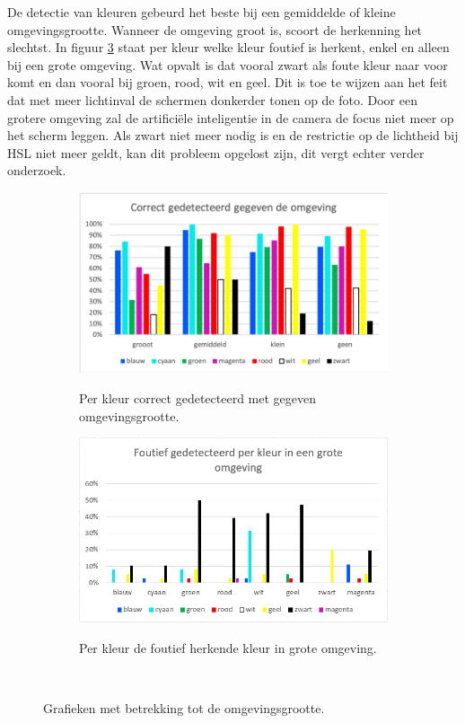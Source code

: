 De detectie van kleuren gebeurd het beste bij een gemiddelde of kleine omgevingsgrootte. Wanneer de omgeving groot is, scoort de herkenning het slechtst. In figuur \ref{fig:groteOmgevingFoutHerkent} staat per kleur welke kleur foutief is herkent, enkel en alleen bij een grote omgeving. Wat opvalt is dat vooral zwart als foute kleur naar voor komt en dan vooral bij groen, rood, wit en geel. Dit is toe te wijzen aan het feit dat met meer lichtinval de schermen donkerder tonen op de foto. Door een grotere omgeving zal de artificiële inteligentie in de camera de focus niet meer op het scherm leggen. Als zwart niet meer nodig is en de restrictie op de lichtheid bij HSL niet meer geldt, kan dit probleem opgelost zijn, dit vergt echter verder onderzoek.
\begin{figure}
	\begin{subfigure}{0.5\textwidth}
	\centering
	\includegraphics{img/Environment}
	\label{fig:omgeving}
	\caption{Per kleur correct gedetecteerd met gegeven omgevingsgrootte.}
	\end{subfigure}
	
	\begin{subfigure}{0.5\textwidth}
	\centering
	\includegraphics{img/BigEnvPerColor}
	\label{fig:groteOmgevingFoutHerkent}
	\caption{Per kleur de foutief herkende kleur in grote omgeving.}
	\end{subfigure} \\
	\caption{Grafieken met betrekking tot de omgevingsgrootte.}
\end{figure}